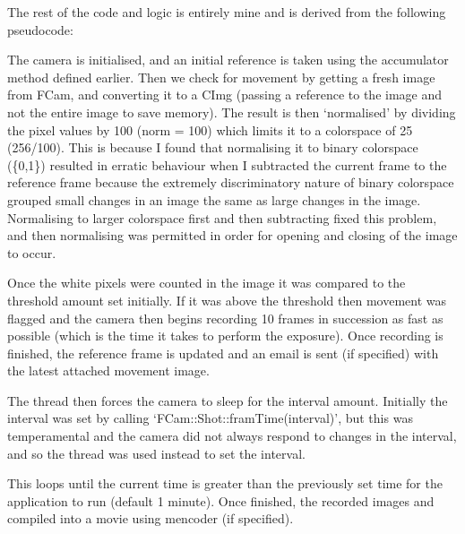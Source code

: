 The rest of the code and logic is entirely mine and is derived from the following pseudocode:
\begin{frame}[fragile]
	
\end{frame}
The camera is initialised, and an initial reference is taken using the accumulator method defined earlier. Then we check for movement by getting a fresh image from FCam, and converting it to a CImg (passing a reference to the image and not the entire image to save memory). The result is then ‘normalised’ by dividing the pixel values by 100 (norm = 100) which limits it to a colorspace of 25 (256/100). This is because I found that normalising it to binary colorspace (\{0,1\}) resulted in erratic behaviour when I subtracted the current frame to the reference frame because the extremely discriminatory nature of binary colorspace grouped small changes in an image the same as  large changes in the image. Normalising to larger colorspace first and then subtracting fixed this problem, and then normalising was permitted in order for opening and closing of the image to occur.

Once the white pixels were counted in the image it was compared to the threshold amount set initially. If it was above the threshold then movement was flagged and the camera then begins recording 10 frames in succession as fast as possible (which is the time it takes to perform the exposure). Once recording is finished, the reference frame is updated and an email is sent (if specified) with the latest attached movement image. 

The thread then forces the camera to sleep for the interval amount. Initially the interval was set by calling ‘FCam::Shot::framTime(interval)’, but this was temperamental and the camera did not always respond to changes in the interval, and so the thread was used instead to set the interval.

This loops until the current time is greater than the previously set time for the application to run (default 1 minute). Once finished, the recorded images and compiled into a movie using mencoder (if specified).

